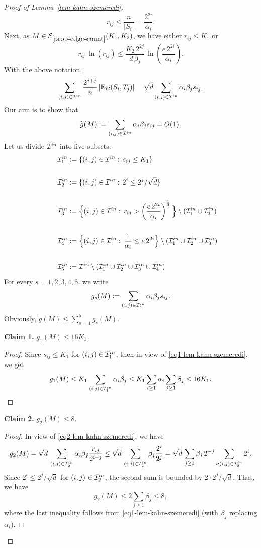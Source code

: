 \documentclass[12pt]{article}
\theoremstyle{definition}
\theoremstyle{plain}
\newcommand{\Event}{\mathcal{E}}
\def\nrangr{G}
\def\edg{{\bf E}_{\nrangr}}
\def\InI{{\cal{I}}^{in}}
\begin{document}
\begin{proof}[Proof of Lemma~\ref{lem-kahn-szemeredi}]
\begin{equation}
r_{ij}\leq \frac{n}{\vert S_i\vert}
=  \frac{2^{2i}}{\alpha_i}.
\end{equation}
Next, as $M\in \Event_{\ref{prop-edge-count}}(K_1,K_2)$, we have
either $r_{ij}\leq K_1$ or 
\begin{equation}\label{eq-discrep-kahn-szemeredi}
r_{ij}\, \ln(r_{ij})\leq \frac{ K_2\, 2^{2j}}{d\, \beta_j} \, 
\ln\left( \frac{e\, 2^{2i}}{\alpha_i}\right).
\end{equation}
With the above notation,
$$
\sum_{(i,j)\in \InI} \frac{2^{i+j}}{n}\, \vert\edg(S_i,T_j)\vert 
=\sqrt{d} \sum_{(i,j)\in\InI}\alpha_i\beta_js_{ij}.
$$
Our aim is to show that
$$\widetilde g(M):=\sum_{(i,j)\in\InI}\alpha_i\beta_js_{ij}=O(1).$$
Let us divide $\InI$ into five subsets: 
\begin{align*}
\quad \quad 
&\InI_1:=\{(i,j)\in \InI:\, s_{ij}\leq K_1\}\\ 
&\\
& \InI_2:=\{(i,j)\in  \InI:\, 2^i\leq 2^{j}/\sqrt{d}\}\\
&\\
& \InI_3:=\Big\{(i,j)\in \InI:\, r_{ij}>  \left(\frac{e\, 2^{2i}}{\alpha_i}\right)^{\frac14}\Big\}\setminus (\InI_1\cup\InI_2)\\
&\\
& \InI_4:=\Big\{(i,j)\in  \InI:\, \frac{1}{\alpha_i}\leq e\, 2^{2i}\Big\}\setminus ( \InI_1\cup  \InI_2\cup\InI_3) \\
&\\
& \InI_5:= \InI\setminus (\InI_1\cup \InI_2 \cup\InI_3\cup\InI_4)
\end{align*}
For every $s=1,2,3,4,5$, we write 
$$
g_s(M):=\sum_{(i,j)\in\InI_s}\alpha_i\beta_js_{ij}.
$$
Obviously, $\widetilde g(M)\leq \sum_{s=1}^5 g_s(M)$. 

\medskip

\noindent\textbf{Claim 1.} $g_1(M)\leq 16K_1$.
\begin{proof}
Since $s_{ij}\leq K_1$ for $(i,j)\in \InI_1$, then 
in view of \eqref{eq1-lem-kahn-szemeredi}, we get
$$
g_1(M)\leq K_1\sum_{(i,j)\in \InI_1}\alpha_i\beta_j
\leq K_1\sum_{i\geq 1} \alpha_i\sum_{j\geq 1}\beta_j
\leq 16K_1.
$$
\end{proof}

\medskip

\noindent\textbf{Claim 2.} $g_2(M)\leq 8$.
\begin{proof}
In view of \eqref{eq2-lem-kahn-szemeredi}, we have
$$
g_2(M)=\sqrt{d}\, \sum_{(i,j)\in\InI_2}\alpha_i\beta_j\frac{r_{ij}}{2^{i+j}}
\leq \sqrt{d}\, \sum_{(i,j)\in\InI_2}\beta_j\frac{2^i}{2^{j}}
=\sqrt{d}\, \sum_{j\geq 1}\beta_j\, 2^{-j} \sum_{i: (i,j)\in\InI_2} 2^i.
$$
Since $2^{i}\leq 2^j/\sqrt{d}$ for $(i,j)\in \InI_2$,
the second sum is bounded by $2\cdot 2^j/\sqrt{d}$. Thus, we have 
$$
g_2(M)\leq 2 \sum_{j\geq 1}\beta_j\leq 8,
$$
where the last inequality follows from \eqref{eq1-lem-kahn-szemeredi} (with $\beta_j$ replacing $\alpha_i$).
\end{proof}


\end{proof}
\end{document}
